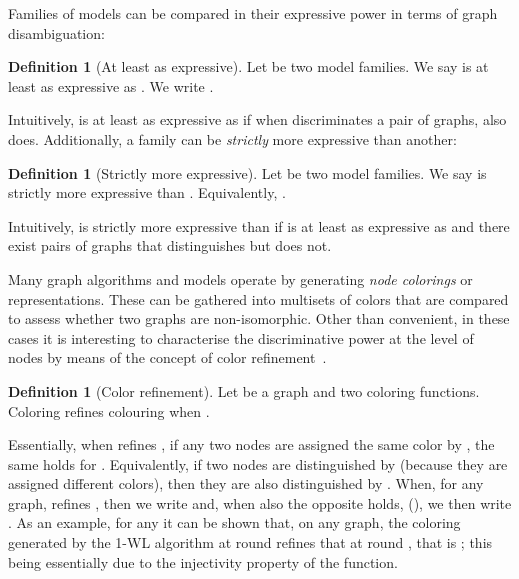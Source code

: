 \documentclass{article}
\theoremstyle{plain}
\theoremstyle{definition}
\newtheorem{definition}[theorem]{Definition}
\theoremstyle{remark}
\begin{document}
Families of models can be compared in their expressive power in terms of graph disambiguation:
\begin{definition}[At least as expressive]\label{def:at_least_as_expressive}
    Let  be two model families. We say  is at least as expressive as . We write .
\end{definition}

Intuitively,  is at least as expressive as  if when  discriminates a pair of graphs, also  does. Additionally, a family can be \emph{strictly} more expressive than another:

\begin{definition}[Strictly more expressive] \label{def:strictly_more_expressive}
    Let  be two model families. We say  is strictly more expressive than . Equivalently, .
\end{definition}

Intuitively,  is strictly more expressive than  if  is at least as expressive as  and there exist pairs of graphs that  distinguishes but  does not. 

Many graph algorithms and models operate by generating \emph{node colorings} or representations. These can be gathered into multisets of colors that are compared to assess whether two graphs are non-isomorphic. Other than convenient, in these cases it is interesting to characterise the discriminative power at the level of nodes by means of the concept of {color refinement}~\cite{morris2019weisfeiler,bodnar2022neural,bevilacqua2022equivariant}. 
\begin{definition}[Color refinement]
    Let  be a graph and  two coloring functions. Coloring  refines colouring  when .
\end{definition}
\noindent Essentially, when  refines , if any two nodes are assigned the same color by , the same holds for . Equivalently, if two nodes are distinguished by  (because they are assigned different colors), then they are also distinguished by . When, for any graph,  refines , then we write  and, when also the opposite holds, (), we then write . As an example, for any  it can be shown that, on any graph, the coloring generated by the 1-WL algorithm at round  refines that at round , that is ; this being essentially due to the injectivity property of the  function.
\end{document}
